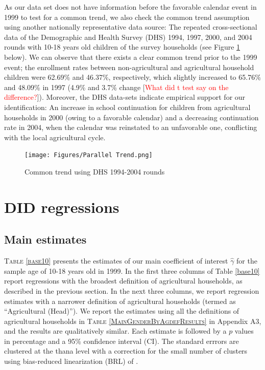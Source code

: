 \documentclass[12pt,letterpaper]{article}
\newcommand{\SAdded}[1]{\textcolor{red}{#1}}
\newcommand{\0}{\ensuremath{\mbox{\boldmath $0$}}}
\begin{document}
As our data set does not have information before the favorable calendar event in 1999 to test for a common trend, we also check the common trend assumption using another nationally representative data source: The repeated cross-sectional data of the Demographic and Health Survey (DHS) 1994, 1997, 2000, and 2004 rounds with 10-18 years old children of the survey households (see Figure \ref{ptrendDHS} below). We can observe that there exists a clear common trend prior to the 1999 event; the enrollment rates between non-agricultural and agricultural household children were 62.69\% and 46.37\%, respectively, which slightly increased to 65.76\% and 48.09\% in 1997 (4.9\% and 3.7\% change [\SAdded{What did t test say on the difference?}]). Moreover, the DHS data-sets indicate empirical support for our identification: An increase in school continuation for children from agricultural households in 2000 (owing to a favorable calendar) and a decreasing continuation rate in 2004, when the calendar was reinstated to an unfavorable one, conflicting with the local agricultural cycle. 


\begin{figure}[h!]
\centering
\texttt{[image: Figures/Parallel Trend.png]}\\
\caption{Common trend using DHS 1994-2004 rounds}
\label{ptrendDHS}
\end{figure}




\section{DID regressions}\label{sec_DID}
\subsection{Main estimates}

\textsc{\small Table \ref{base10}} presents the estimates of our main coefficient of interest $\hat{\gamma}$ for the sample age of 10-18 years old in 1999. In the first three columns of Table \ref{base10} report regressions with the broadest definition of agricultural households, as described in the previous section. In the next three columns, we report regression estimates with a narrower definition of agricultural households (termed as ``Agricultural (Head)''). We report the estimates using all the definitions of agricultural households in \textsc{Table \ref{MainGenderByAgdefResults}} in Appendix A3, and the results are qualitatively similar. Each estimate is followed by a $p$ values in percentage and a 95\% confidence interval (CI). The standard errrors are clustered at the thana level with a correction for the small number of clusters using bias-reduced linearization (BRL) of \citet{PustejovskyTipton2018}.
\end{document}
